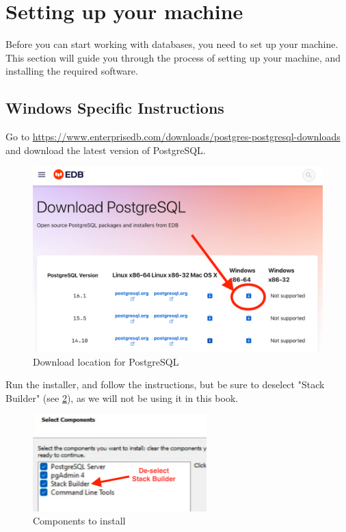 \section{Setting up your machine}
Before you can start working with databases, you need to set up your machine. This section will guide you through the process of setting up your machine, and installing the required software.

\subsection{Windows Specific Instructions}
Go to \url{https://www.enterprisedb.com/downloads/postgres-postgresql-downloads} and download the latest version of PostgreSQL. 
\begin{figure}[htb]
    \centering
    \includegraphics[width=1\textwidth]{content/1-relational-databases/figures/1.install-for-windows-1.png}
    \caption{Download location for PostgreSQL}
    \label{fig:1.postgresql-download-1.png}
\end{figure}

Run the installer, and follow the instructions, but be sure to deselect "Stack Builder" (see \cref{fig:1.postgresql-download-2.png}), as we will not be using it in this book. 

\begin{figure}[htb]
    \centering
    \includegraphics[width=0.6\textwidth]{content/1-relational-databases/figures/1.install-for-windows-2.png}
    \caption{Components to install}
    \label{fig:1.postgresql-download-2.png}
\end{figure}

